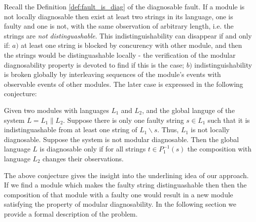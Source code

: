 \documentclass[a4paper, 10pt, conference]{ieeeconf}
\begin{document}
Recall the Definition \ref{def:fault_is_diag} of the diagnosable fault. If a
module is not locally diagnosable then exist at least two strings in its
language, one is faulty and one is not, with the same observation of arbitrary
length, i.e. the strings are \emph{not distinguashable}. This
indistinguishability can disappear if and only if:
$a)$ at least one string is blocked by concurency with other module, and
then the strings would be distinguashable locally - the verification of the
modular diagnosability property is devoted to find if this is the case; 
$b)$ indistinguishability is broken globally by interleaving sequences of
the module's events with observable events of other modules. The later case
is expressed in the following conjecture:
\begin{conjecture} Given two modules with languages $L_1$ and $L_2$, and the
global languge of the system $L = L_1 \parallel L_2$. Suppose there is only one
faulty string $s \in L_1$ such that it is indistinguashable from at least one
string of $L_1\backslash s$. Thus, $L_1$ is not locally diagnosable. Suppose the
system is not modular diagnosable. Then the global language $L$ is diagnosable
only if for all strings $t \in P_1^{-1}(s)$ the composition with language $L_2$
changes their observations.
\end{conjecture}

The above conjecture gives the insight into the underlining idea of our
approach. If we find a module which makes the faulty string distinguashable then
then the composition of that module with a faulty one would result in a new
module satisfying the property of modular diagnosability. In the following
section we provide a formal description of the problem.

   
% 

% 
\end{document}
